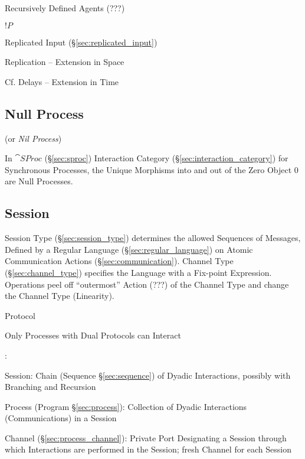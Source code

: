 Recursively Defined Agents (???)

$!P$

Replicated Input (\S\ref{sec:replicated_input})

Replication -- Extension in Space

\fist Cf. Delays -- Extension in Time \cite{abramsky-gay-nagarajan96}



\subsection{Null Process}\label{sec:null_process}

(or \emph{Nil Process})

In $\cat{SProc}$ (\S\ref{sec:sproc}) Interaction Category
(\S\ref{sec:interaction_category}) for Synchronous Processes, the
Unique Morphisms into and out of the Zero Object $0$ are Null
Processes.



\subsection{Session}\label{sec:session}

Session Type (\S\ref{sec:session_type}) determines the allowed
Sequences of Messages, Defined by a Regular Language
(\S\ref{sec:regular_language}) on Atomic Communication Actions
(\S\ref{sec:communication}). Channel Type (\S\ref{sec:channel_type})
specifies the Language with a Fix-point Expression. Operations peel
off ``outermost'' Action (???) of the Channel Type and change the
Channel Type (Linearity). \cite{neubauer-thiemann04}

Protocol

Only Processes with Dual Protocols can Interact

\cite{honda-vasconcelos-kubo98}:

Session: Chain (Sequence \S\ref{sec:sequence}) of Dyadic Interactions,
possibly with Branching and Recursion

Process (Program \S\ref{sec:process}): Collection of Dyadic
Interactions (Communications) in a Session

Channel (\S\ref{sec:process_channel}): Private Port Designating a
Session through which Interactions are performed in the Session; fresh
Channel for each Session

